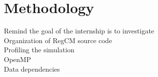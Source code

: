 \chapter{Methodology}

Remind the goal of the internship is to investigate \\
Organization of RegCM source code\\
Profiling the simulation\\
OpenMP\\
Data dependencies\\
